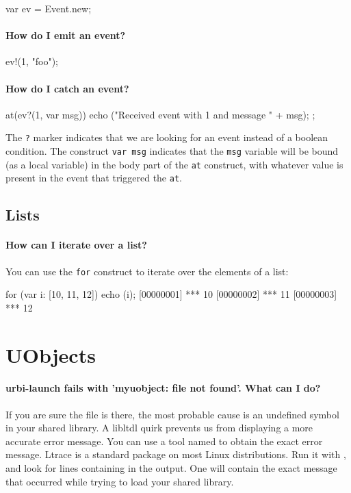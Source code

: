 \begin{urbifixme}
var ev = Event.new;
\end{urbifixme}

\paragraph{How do I emit an event?}
\begin{urbifixme}
ev!(1, "foo");
\end{urbifixme}

\paragraph{How do I catch an event?}
\begin{urbifixme}
at(ev?(1, var msg)) {
  echo ("Received event with 1 and message " + msg);
};
\end{urbifixme}

The \lstinline{?} marker indicates that we are looking for an event
instead of a boolean condition. The construct \lstinline{var msg}
indicates that the \lstinline{msg} variable will be bound (as a local
variable) in the body part of the \lstinline{at} construct, with
whatever value is present in the event that triggered the
\lstinline{at}.

\subsection{Lists}
\paragraph{How can I iterate over a list?}

You can use the \lstinline{for} construct to iterate over the elements
of a list:

\begin{urbiscript}
for (var i: [10, 11, 12]) echo (i);
[00000001] *** 10
[00000002] *** 11
[00000003] *** 12
\end{urbiscript}


\section{UObjects}

\paragraph{urbi-launch fails with 'myuobject: file not found'. What can I do?}
If you are sure the file is there, the most probable cause is an
undefined symbol in your shared library. A libltdl quirk prevents us
from displaying a more accurate error message.  You can use a tool
named  to obtain the exact error message.  Ltrace is a
standard package on most Linux distributions.  Run it with
, and look for lines
containing  in the output. One will contain the exact
message that occurred while trying to load your shared library.

